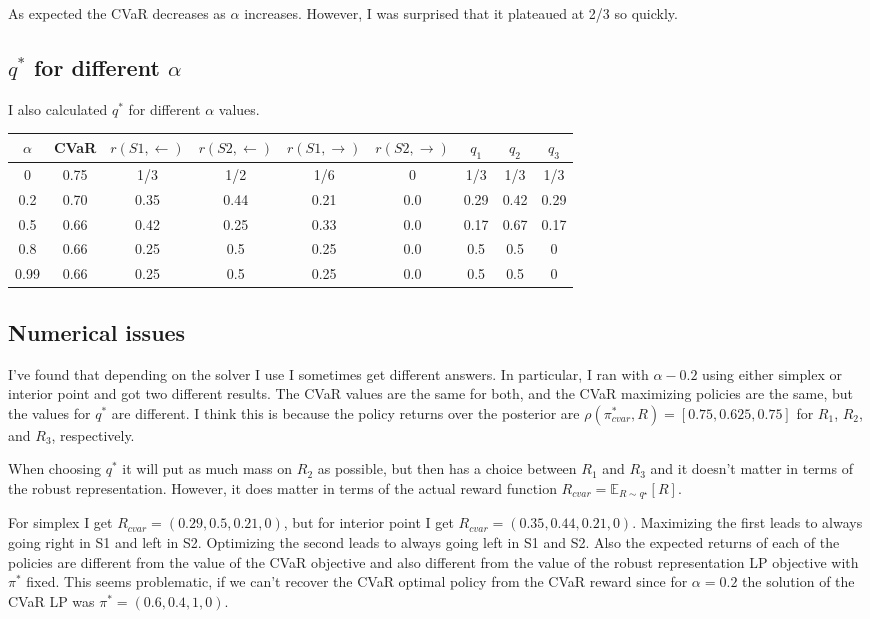 \documentclass{article}
\newcommand{\Ex}{\mathbb{E}}
\newcommand{\opt}{^{\star}}
\begin{document}
As expected the CVaR decreases as $\alpha$ increases. However, I was surprised that it plateaued at 2/3 so quickly. 

\subsection{$q^*$ for different $\alpha$}
I also calculated $q^*$ for different $\alpha$ values.


\begin{center}
\begin{tabular}{c|c|cccc|ccc}
\hline 
$\alpha$ & CVaR & $r(S1, \leftarrow)$ & $r(S2,\leftarrow)$ & $r(S1, \rightarrow)$ & $r(S2, \rightarrow)$ & $q_1$ & $q_2$ & $q_3$\\ 
\hline 
0 & 0.75 & 1/3 & 1/2 & 1/6 & 0 & 1/3 & 1/3 & 1/3 \\
0.2& 0.70 & 0.35 & 0.44 & 0.21 & 0.0 & 0.29 & 0.42 & 0.29 \\
 0.5& 0.66 & 0.42 & 0.25 & 0.33 & 0.0 & 0.17 & 0.67 & 0.17 \\
 0.8& 0.66 & 0.25 & 0.5 & 0.25 & 0.0 & 0.5 & 0.5 & 0 \\
  0.99& 0.66 & 0.25 & 0.5 & 0.25 & 0.0 & 0.5 & 0.5 & 0 \\
\hline 
\end{tabular} 
\end{center}

\subsection{Numerical issues}
I've found that depending on the solver I use I sometimes get different answers. In particular, I ran with $\alpha - 0.2$ using either simplex or interior point and got two different results. The CVaR values are the same for both, and the CVaR maximizing policies are the same, but the values for $q^*$ are different. I think this is because the policy returns over the posterior are $\rho(\pi^*_{cvar},R) = [0.75 , 0.625, 0.75 ]$ for $R_1$, $R_2$, and $R_3$, respectively.

When choosing $q^*$ it will put as much mass on $R_2$ as possible, but then has a choice between $R_1$ and $R_3$ and it doesn't matter in terms of the robust representation. However, it does matter in terms of the actual reward function $R_{cvar} = \Ex_{R \sim q\opt}[R]$.

For simplex I get $R_{cvar} = (0.29, 0.5, 0.21, 0)$, but for interior point I get $R_{cvar} = (0.35, 0.44, 0.21, 0)$. Maximizing the first leads to always going right in S1 and left in S2. Optimizing the second leads to always going left in S1 and S2. Also the expected returns of each of the policies are different from the value of the CVaR objective and also different from the value of the robust representation LP objective with $\pi^*$ fixed. This seems problematic, if we can't recover the CVaR optimal policy from the CVaR reward since for $\alpha=0.2$ the solution of the CVaR LP was $\pi^* = (0.6, 0.4, 1, 0)$.
 
\end{document}
